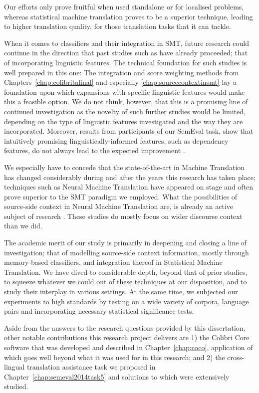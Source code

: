 Our efforts only prove fruitful when used standalone or for localised problems,
whereas statistical machine translation proves to be a superior technique,
leading to higher translation quality, for those translation tasks that it can
tackle.

When it comes to classifiers and their integration in SMT, future research could continue in the direction that
past studies such as \cite{Rejwanul+11} have already proceeded; that of incorporating linguistic
features. The technical foundation for such studies is well prepared in this one: The integration and score weighting methods from Chapters~\ref{chap:colibritafinal} and especially
\ref{chap:sourcecontextinsmt} lay a foundation upon which expansions with specific linguistic features would make this a
feasible option. We do not think, however, that this is a promising line of continued investigation as the
novelty of such further studies would be limited, depending on the type of linguistic features
investigated and the way they are incorporated. Moreover, results from participants of our SemEval task, show
that intuitively promising linguistically-informed features, such as dependency features, do not always lead to the
expected improvement \citep{UNAL,IUCL}.

We especially have to concede that the state-of-the-art in Machine Translation has changed considerably during and after
the years this research has taken place; techniques such as Neural Machine Translation have appeared on stage and often
prove superior to the SMT paradigm we employed. What the possibilities of source-side context in Neural Machine
Translation are, is already an active subject of research \citep{Jean+17,Wang+17,Bawden+17,Maruf+17}. These studies
do mostly focus on wider discourse context than we did.

The academic merit of our study is primarily in deepening and closing a line of investigation; that of modelling
source-side context information, mostly through memory-based classifiers, and integration thereof in Statistical Machine
Translation. We have dived to considerable depth, beyond that of prior studies, to
squeeze whatever we could out of these techniques at our disposition, and to study their interplay in various settings.
At the same time, we subjected our experiments to high standards by testing on a wide variety of corpora, language pairs and incorporating necessary statistical significance tests.

Aside from the answers to the research questions provided by this dissertation, other notable contributions this research
project delivers are 1) the Colibri Core software that was developed and described in Chapter~\ref{chap:coco},
application of which goes well beyond what it was used for in this research; and 2) the cross-lingual translation
assistance task we proposed in Chapter~\ref{chap:semeval2014task5} and solutions to which were extensively studied.



